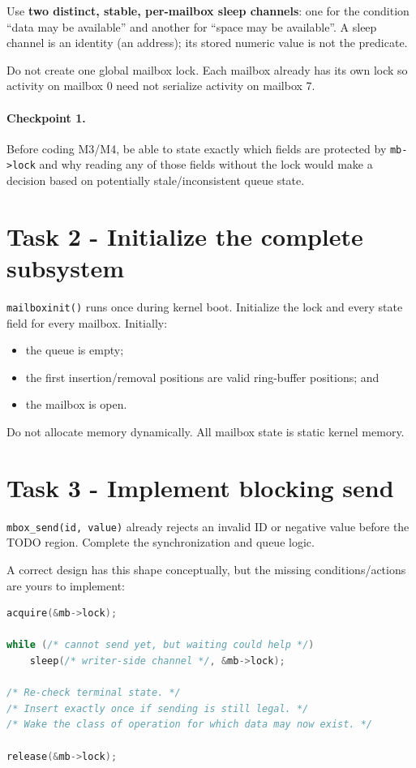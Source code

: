\documentclass[11pt,a4paper]{article}
\newcommand{\file}[1]{\texttt{#1}}
\begin{document}
Use \textbf{two distinct, stable, per-mailbox sleep channels}: one for the condition ``data may be available'' and another for ``space may be available''. A sleep channel is an identity (an address); its stored numeric value is not the predicate.

Do not create one global mailbox lock. Each mailbox already has its own lock so activity on mailbox 0 need not serialize activity on mailbox 7.

\paragraph{Checkpoint 1.} Before coding M3/M4, be able to state exactly which fields are protected by \file{mb->lock} and why reading any of those fields without the lock would make a decision based on potentially stale/inconsistent queue state.

\section{Task 2 - Initialize the complete subsystem}

\file{mailboxinit()} runs once during kernel boot. Initialize the lock and every state field for every mailbox. Initially:

\begin{itemize}[leftmargin=7mm]
\item the queue is empty;
\item the first insertion/removal positions are valid ring-buffer positions; and
\item the mailbox is open.
\end{itemize}

Do not allocate memory dynamically. All mailbox state is static kernel memory.

\section{Task 3 - Implement blocking send}

\file{mbox\_send(id, value)} already rejects an invalid ID or negative value before the TODO region. Complete the synchronization and queue logic.

A correct design has this shape conceptually, but the missing conditions/actions are yours to implement:

\begin{lstlisting}[language=C]
acquire(&mb->lock);

while (/* cannot send yet, but waiting could help */)
    sleep(/* writer-side channel */, &mb->lock);

/* Re-check terminal state. */
/* Insert exactly once if sending is still legal. */
/* Wake the class of operation for which data may now exist. */

release(&mb->lock);
\end{lstlisting}
\end{document}

